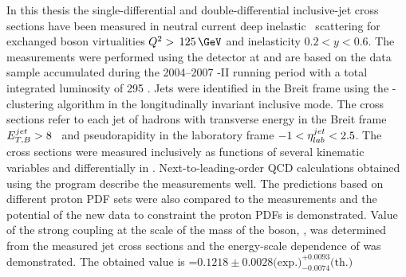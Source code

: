 In this thesis the single-differential and double-differential inclusive-jet cross sections have been measured in neutral current deep inelastic \ep\, scattering for exchanged boson virtualities $\qsq>\,125\,\GeV$ and inelasticity $0.2<y<0.6$. The measurements were performed using the \zeus detector at \hera and are based on the data sample accumulated during the 2004--2007 \hera-II running period with a total integrated luminosity of 295 \invpb. Jets were identified in the Breit frame using the \kt-clustering algorithm in the longitudinally invariant inclusive mode. The cross sections refer to each jet of hadrons with transverse energy in the Breit frame $\mbox{$E_{T,B}^{jet}$} > 8$ \GeV\, and pseudorapidity in the laboratory frame $-1<\mbox{$\eta^{jet}_{lab}$}<2.5$. The cross sections were measured inclusively as functions of several kinematic variables and differentially in \qsq. Next-to-leading-order QCD calculations obtained using the \nlojet program describe the measurements well. The predictions based on different proton PDF sets were also compared to the measurements and the potential of the new data to constraint the proton PDFs is demonstrated. Value of the strong coupling at the scale of the mass of the \zn boson, \asz, was determined from the measured jet cross sections and the energy-scale dependence of \as was demonstrated. The obtained value is \asz=$0.1218\pm 0.0028\text{(exp.)}^{+0.0093}_{-0.0074}\text{(th.)}$